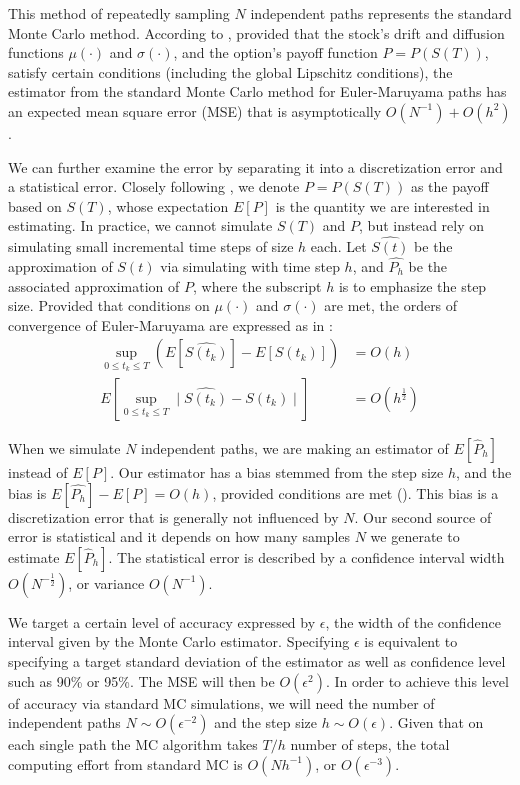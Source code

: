 \documentclass{article}
\begin{document}
    This method of repeatedly sampling $N$ independent paths represents the standard Monte Carlo method. According to \cite{giles08}, provided that the stock's drift and diffusion functions $\mu(\cdot)$ and $\sigma(\cdot)$, and the option's payoff function $P=P(S(T))$, satisfy certain conditions (including the global Lipschitz conditions), the estimator from the standard Monte Carlo method for Euler-Maruyama paths has an expected mean square error (MSE) that is asymptotically $O(N^{-1}) + O(h^2)$. 
    
	We can further examine the error by separating it into a discretization error and a statistical error. Closely following \cite{giles08}, we denote $P=P(S(T))$ as the payoff based on $S(T)$, whose expectation $E[P]$ is the quantity we are interested in estimating. In practice, we cannot simulate $S(T)$ and $P$, but instead rely on simulating small incremental time steps of size $h$ each. Let $\widehat{S(t)}$ be the approximation of $S(t)$ via simulating with time step $h$, and $\widehat{P_h}$ be the associated approximation of $P$, where the subscript $h$ is to emphasize the step size. Provided that conditions on $\mu(\cdot)$ and $\sigma(\cdot)$ are met, the orders of convergence of Euler-Maruyama are expressed as in \cite{higham15}:
	\begin{align*}
	\sup_{0 \leq t_k \leq T} (E[\widehat{S(t_k)}] - E[S(t_k)]) &= O(h) \\
	E[\sup_{0 \leq t_k \leq T}\mid \widehat{S(t_k)} - S(t_k)\mid ] &= O(h^{\frac{1}{2}})
	\end{align*}
    
	When we simulate $N$ independent paths, we are making an estimator of $E[\widehat{P}_h]$ instead of $E[P]$. Our estimator has a bias stemmed from the step size $h$, and the bias is $E[\widehat{P_h}] - E[P] = O(h)$, provided conditions are met (\cite{higham15}). This bias is a discretization error that is generally not influenced by $N$. Our second source of error is statistical and it depends on how many samples $N$ we generate to estimate $E[\widehat{P}_h]$. The statistical error is described by a confidence interval width $O(N^{-\frac{1}{2}})$, or variance $O(N^{-1})$.
	
    We target a certain level of accuracy expressed by $\epsilon$, the width of the confidence interval given by the Monte Carlo estimator. Specifying $\epsilon$ is equivalent to specifying a target standard deviation of the estimator as well as confidence level such as 90\% or 95\%. The MSE will then be $O(\epsilon^2)$. In order to achieve this level of accuracy via standard MC simulations, we will need the number of independent paths $N \sim O(\epsilon^{-2})$ and the step size $h \sim O(\epsilon)$. Given that on each single path the MC algorithm takes $T/h$ number of steps, the total computing effort from standard MC is $O(Nh^{-1})$, or $O(\epsilon^{-3})$. 
    
\end{document}
